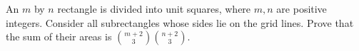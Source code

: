 An $m$ by $n$ rectangle is divided into unit squares, where $m,n$ are positive integers. Consider all subrectangles whose sides lie on the grid lines. Prove that the sum of their areas is $\binom{m+2}{3}\binom{n+2}{3}$.
